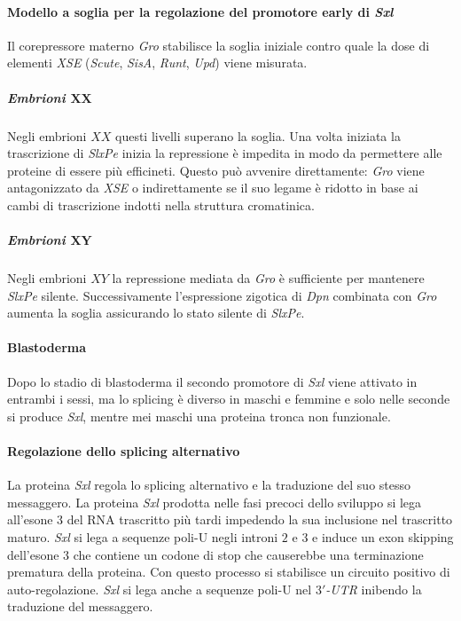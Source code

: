 			\paragraph{Modello a soglia per la regolazione del promotore early di \emph{Sxl}}
			Il corepressore materno \emph{Gro} stabilisce la soglia iniziale contro quale la dose di elementi \emph{XSE} (\emph{Scute}, \emph{SisA}, \emph{Runt}, \emph{Upd}) viene misurata.
				\subparagraph{Embrioni $\mathbf{XX}$}
				Negli embrioni $XX$ questi livelli superano la soglia.
				Una volta iniziata la trascrizione di \emph{SlxPe} inizia la repressione \`e impedita in modo da permettere alle proteine di essere pi\`u efficineti.
				Questo pu\`o avvenire direttamente: \emph{Gro} viene antagonizzato da \emph{XSE} o indirettamente se il suo legame \`e ridotto in base ai cambi di trascrizione indotti nella struttura cromatinica.
				
				\subparagraph{Embrioni $\mathbf{XY}$}
				Negli embrioni $XY$ la repressione mediata da \emph{Gro} \`e sufficiente per mantenere \emph{SlxPe} silente.
				Successivamente l'espressione zigotica di \emph{Dpn} combinata con \emph{Gro} aumenta la soglia assicurando lo stato silente di \emph{SlxPe}.

			\paragraph{Blastoderma}
			Dopo lo stadio di blastoderma il secondo promotore di \emph{Sxl} viene attivato in entrambi i sessi, ma lo splicing \`e diverso in maschi e femmine e solo nelle seconde si produce \emph{Sxl}, mentre mei maschi una proteina tronca non funzionale.

			\paragraph{Regolazione dello splicing alternativo}
			La proteina \emph{Sxl} regola lo splicing alternativo e la traduzione del suo stesso messaggero.
			La proteina \emph{Sxl} prodotta nelle fasi precoci dello sviluppo si lega all'esone $3$ del RNA trascritto pi\`u tardi impedendo la sua inclusione nel trascritto maturo. 
			\emph{Sxl} si lega a sequenze poli-U negli introni $2$ e $3$ e induce un exon skipping dell'esone $3$ che contiene un codone di stop che causerebbe una terminazione prematura della proteina.
			Con questo processo si stabilisce un circuito positivo di auto-regolazione.
			\emph{Sxl} si lega anche a sequenze poli-U nel \emph{$3'$-UTR} inibendo la traduzione del messaggero.

